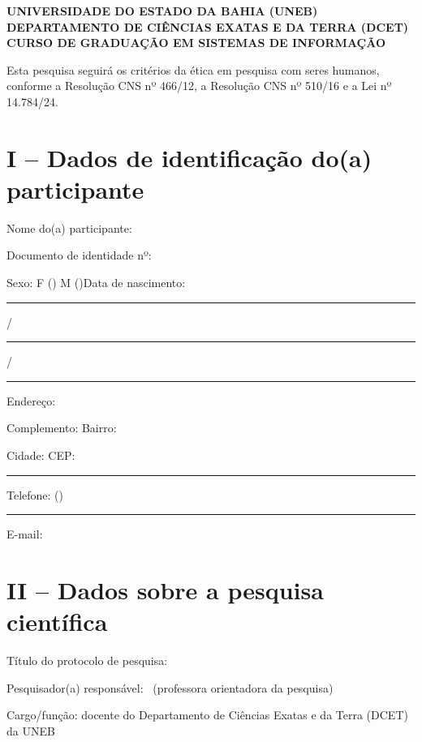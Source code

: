 \label{ap:tcle}

\begin{center}
    \textbf{UNIVERSIDADE DO ESTADO DA BAHIA (UNEB)}\\[0.2cm]
    \textbf{DEPARTAMENTO DE CIÊNCIAS EXATAS E DA TERRA (DCET)}\\[0.2cm]
    \textbf{CURSO DE GRADUAÇÃO EM SISTEMAS DE INFORMAÇÃO}
\end{center}

\noindent Esta pesquisa seguirá os critérios da ética em pesquisa com seres humanos, conforme a Resolução CNS nº 466/12, a Resolução CNS nº 510/16 e a Lei nº 14.784/24.

\section{I -- Dados de identificação do(a) participante}

\noindent Nome do(a) participante: \hrulefill

\noindent Documento de identidade nº: \hrulefill

\noindent Sexo: F (\hspace{0.6cm}) M (\hspace{0.6cm})\hspace{1.5cm}Data de nascimento: \rule{1.2cm}{0.4pt}/\rule{1.2cm}{0.4pt}/\rule{1.8cm}{0.4pt}

\noindent Endereço: \hrulefill

\noindent Complemento: \hrulefill\hspace{0.4cm}Bairro: \hrulefill

\noindent Cidade: \hrulefill\hspace{0.4cm}CEP: \rule{2.5cm}{0.4pt}

\noindent Telefone: (\hspace{0.6cm})\rule{2cm}{0.4pt}\hspace{0.8cm}E-mail: \hrulefill

\section{II -- Dados sobre a pesquisa científica}

\noindent Título do protocolo de pesquisa: \imprimirtitulo

\noindent Pesquisador(a) responsável: \imprimirorientador\ (professora orientadora da pesquisa)

\noindent Cargo/função: docente do Departamento de Ciências Exatas e da Terra (DCET) da UNEB

